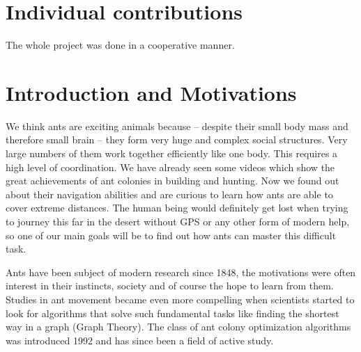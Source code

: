 \documentclass[11pt]{article}
\begin{document}
\newpage


\tableofcontents

\newpage






\section{Individual contributions}
The whole project was done in a cooperative manner.
\newpage

\section{Introduction and Motivations}

We think ants are exciting animals because – despite their small body mass and therefore small brain – they form very huge and complex social structures. Very large numbers of them work together efficiently like one body. This requires a high level of coordination. We have already seen some videos which show the great achievements of ant colonies in building and hunting. Now we found out about their navigation abilities and are curious to learn how ants are able to cover extreme distances. The human being would definitely get lost when trying to journey this far in the desert without GPS or any other form of modern help, so one of our main goals will be to find out how ants can master this difficult task.

Ants have been subject of modern research since 1848, the motivations were often interest in their instincts, society and of course the hope to learn from them. Studies in ant movement became even more compelling when scientists started to look for algorithms that solve such fundamental tasks like finding the shortest way in a graph (Graph Theory). The class of ant colony optimization algorithms was introduced 1992 and has since been a field of active study.
\end{document}
